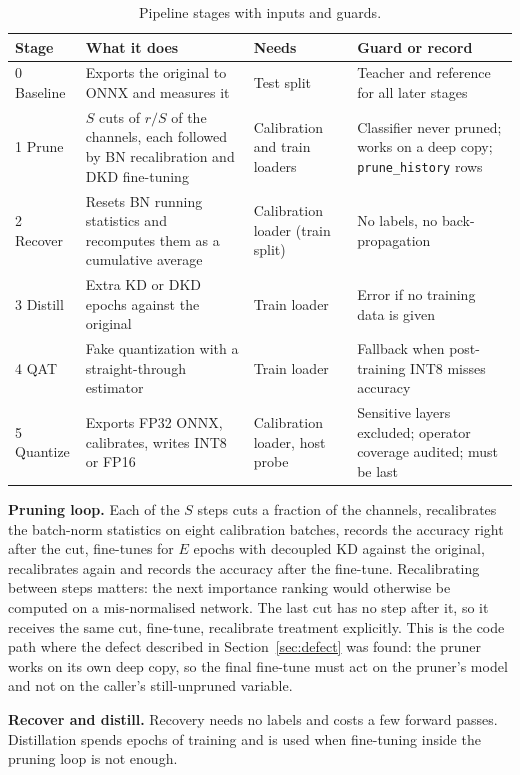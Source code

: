 \documentclass[oneside,a4paper,12pt]{report}
\newcommand{\code}[1]{\texttt{\small #1}}
\begin{document}
\begin{table}[!htbp]
\centering
\small
\setlength{\tabcolsep}{3pt}
\begin{tabularx}{\textwidth}{@{}l X X X@{}}
\toprule
Stage & What it does & Needs & Guard or record\\
\midrule
0 Baseline & Exports the original to ONNX and measures it & Test split & Teacher and reference for all later stages\\
1 Prune & $S$ cuts of $r/S$ of the channels, each followed by BN recalibration and DKD fine-tuning & Calibration and train loaders & Classifier never pruned; works on a deep copy; \code{prune\_history} rows\\
2 Recover & Resets BN running statistics and recomputes them as a cumulative average & Calibration loader (train split) & No labels, no back-propagation\\
3 Distill & Extra KD or DKD epochs against the original & Train loader & Error if no training data is given\\
4 QAT & Fake quantization with a straight-through estimator & Train loader & Fallback when post-training INT8 misses accuracy\\
5 Quantize & Exports FP32 ONNX, calibrates, writes INT8 or FP16 & Calibration loader, host probe & Sensitive layers excluded; operator coverage audited; must be last\\
\bottomrule
\end{tabularx}
\caption{Pipeline stages with inputs and guards.}
\label{tab:stages}
\end{table}

\textbf{Pruning loop.} Each of the $S$ steps cuts a fraction of the channels, recalibrates the batch-norm statistics on eight calibration batches, records the accuracy right after the cut, fine-tunes for $E$ epochs with decoupled KD against the original, recalibrates again and records the accuracy after the fine-tune. Recalibrating between steps matters: the next importance ranking would otherwise be computed on a mis-normalised network. The last cut has no step after it, so it receives the same cut, fine-tune, recalibrate treatment explicitly. This is the code path where the defect described in Section~\ref{sec:defect} was found: the pruner works on its own deep copy, so the final fine-tune must act on the pruner's model and not on the caller's still-unpruned variable.

\textbf{Recover and distill.} Recovery needs no labels and costs a few forward passes. Distillation spends epochs of training and is used when fine-tuning inside the pruning loop is not enough.
\end{document}
